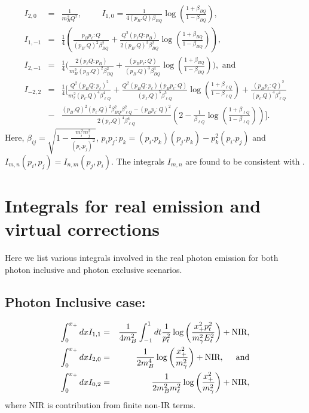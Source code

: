 \documentclass[a4paper,11pt]{article}
\begin{document}
{{\begin{eqnarray}
		I_{2,0}&=& \frac{1}{m_{B}^{2}Q^{2}},\hspace{1cm}I_{1,0}= \frac{1}{4 (p_{B}.Q)\beta_{B Q}}\log\left(\frac{1+\beta_{B Q}}{1-\beta_{B Q}}\right) ,\nonumber\\
		I_{1,-1} &=& \frac{1}{4}\left(\frac{p_{B}p_{\ell}:Q}{(p_{B}.Q)^{2}\beta_{B Q}^{2}}+\frac{Q^{2} (p_{\ell} Q: p_{B})}{2(p_{B}.Q)^{3}\beta_{B Q}^{2}}\log\left(\frac{1+\beta_{B Q}}{1-\beta_{B Q}}\right)\right),\nonumber\\
		I_{2,-1}&=& \frac{1}{4}\Big(\frac{2(p_{\ell}Q:p_{B})}{m_{B}^{2}(p_{B}.Q)^{2}\beta_{B Q}^{2}}+\frac{(p_{B}p_{\ell}:Q)}{(p_{B}.Q)^{3} \beta_{B Q}^{3}}\log\left(\frac{1+\beta_{B Q}}{1-\beta_{B Q}}\right)\Big), \text{ and}\nonumber\\
		I_{-2,2}&=&\frac{1}{4}\Big[\frac{Q^{2}(p_{B}Q:p_{\ell})^{2}}{m_{\ell}^{2}(p_{\ell}.Q)^{4}\beta_{\ell Q}^{4}}+\frac{Q^{2}(p_{B}Q:p_{\ell})(p_{B}p_{\ell}:Q)}{(p_{\ell}.Q)^{5}\beta_{\ell Q}^{5}}\log\left(\frac{1+\beta_{\ell Q}}{1-\beta_{\ell Q}}\right)+\frac{(p_{B}p_{\ell}:Q)^{2}}{(p_{\ell}.Q)^{4}\beta_{\ell Q}^{4}}\nonumber\\
		&-&\frac{(p_{B}.Q)^{2}(p_{\ell}.Q)^{2}\beta_{B Q}^{2}\beta_{\ell Q}^{2}-(p_{B}p_{\ell}:Q)^{2}}{2(p_{\ell}.Q)^{4}\beta_{\ell Q}^{4}}\left(2-\frac{1}{\beta_{\ell Q}}\log\left(\frac{1+\beta_{\ell Q}}{1-\beta_{\ell Q}}\right)\right)\Big]. \nonumber
		\end{eqnarray}}
		Here, $\beta_{i j}=\sqrt{1-\frac{m_{i}^{2}m_{j}^{2}}{(p_{i}.p_{j})^{2}}}$,  
		$p_{i}p_{j}:p_{k}=(p_{i}.p_{k})(p_{j}.p_{k})-p_{k}^{2}(p_{i}.p_{j})$ and $I_{m,n}(p_{i},p_{j})= I_{n,m}(p_{j},p_{i})$. The integrals $I_{m,n}$ are found to be consistent with \cite{Ginsberg:1967gvl}.
    	}
    	
		\section{Integrals for real emission and virtual corrections}
		\label{appd}
		Here we list various integrals involved in the real photon emission for both photon inclusive and photon exclusive scenarios.
		 \subsection{Photon Inclusive case:}
		\begin{eqnarray}
		\int_{0}^{x_{+}} dx I_{1,1}&=& \frac{1}{4m_B^2} \int_{-1}^{1} dt \frac{1}{p_{t}^{2}}\log\left(\frac{x_{+}^2 p_t^2}{m_{\gamma}^2 E_t^2}\right)+\text{NIR},\nonumber\\
		\int_{0}^{x_{+}} dx I_{2,0}&=& \frac{1}{2m_{B}^{4}}\log\left(\frac{x_{+}^2}{m_{\gamma}^{2}}\right)+ \text{NIR}, \hspace{0.5cm}\text{and}\nonumber\\
		\int_{0}^{x_{+}} dx I_{0,2}&=& \frac{1}{2m_B^2 m_{\ell}^{2}}\log\left(\frac{x_{+}^2 }{m_{\gamma}^{2}}\right)+\text{NIR},\nonumber
		\end{eqnarray}
		where $\text{NIR}$ is contribution from finite non-IR terms. 
\end{document}
